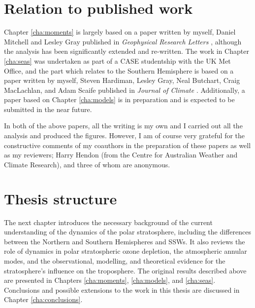 \section{Relation to published work}
Chapter \ref{cha:moments} is largely based on a paper written by myself, Daniel
Mitchell and Lesley Gray published in \emph{Geophysical Research Letters}
\citep{Seviour2013}, although the analysis has been significantly extended and
re-written. The work in Chapter \ref{cha:seas} was undertaken as part of a CASE
studentship with the UK Met Office, and the part which relates to the Southern
Hemisphere is based on a paper written by myself, Steven Hardiman, Lesley Gray,
Neal Butchart, Craig MacLachlan, and Adam Scaife published in \emph{Journal of
  Climate} \citep{Seviour2014}. Additionally, a paper based on Chapter
\ref{cha:models} is in preparation and is expected to be submitted in the near
future.

In both of the above papers, all the writing is my own and I carried out all the
analysis and produced the figures. However, I am of course very grateful for the
constructive comments of my coauthors in the preparation of these papers as well
as my reviewers; Harry Hendon (from the Centre for Australian Weather and
Climate Research), and three of whom are anonymous.

\section{Thesis structure}

The next chapter introduces the necessary background of the current
understanding of the dynamics of the polar stratosphere, including the
differences between the Northern and Southern Hemispheres and SSWs. It also
reviews the role of dynamics in polar stratospheric ozone depletion, the
atmospheric annular modes, and the observational, modelling, and theoretical
evidence for the stratosphere's influence on the troposphere. The original
results described above are presented in Chapters \ref{cha:moments},
\ref{cha:models}, and \ref{cha:seas}. Conclusions and possible extensions to
the work in this thesis are discussed in Chapter \ref{cha:conclusions}. 










